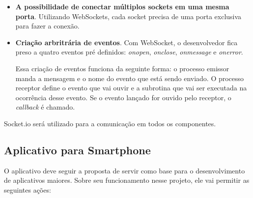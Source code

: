 \documentclass[a4paper,12pt]{article}
\begin{document}
\begin{itemize}

\item \textbf{A possibilidade de conectar múltiplos sockets em uma mesma porta}. Utilizando WebSockets, cada socket precisa de uma porta exclusiva para fazer a conexão.

\item \textbf{Criação arbritrária de eventos}. Com WebSocket, o desenvolvedor fica preso a quatro eventos pré definidos: \emph{onopen}, \emph{onclose}, \emph{onmessage} e \emph{onerror}.

Essa criação de eventos funciona da seguinte forma: o processo emissor manda a mensagem e o nome do evento que está sendo enviado. O processo receptor define o evento que vai ouvir e a subrotina que vai ser executada na ocorrência desse evento. Se o evento lançado for ouvido pelo receptor, o \emph{callback} é chamado.
\end{itemize}

Socket.io será utilizado para a comunicação em todos os componentes.%



\newpage
\subsection{Aplicativo para Smartphone}

O aplicativo deve seguir a proposta de servir como base para o desenvolvimento de aplicativos maiores. Sobre seu funcionamento nesse projeto, ele vai permitir as seguintes ações:
\end{document}

